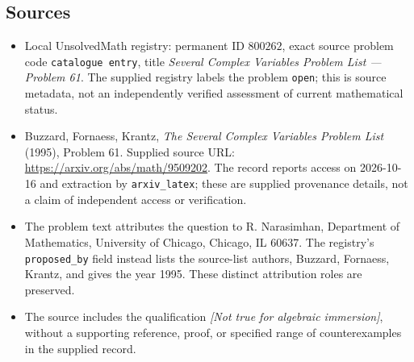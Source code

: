\documentclass[11pt]{article}
\begin{document}
\subsection{Sources}
\begin{itemize}
\item Local UnsolvedMath registry: permanent ID \(800262\), exact source problem code \texttt{catalogue entry}, title \emph{Several Complex Variables Problem List --- Problem 61}. The supplied registry labels the problem \texttt{open}; this is source metadata, not an independently verified assessment of current mathematical status.
\item Buzzard, Fornaess, Krantz, \emph{The Several Complex Variables Problem List} (1995), Problem 61. Supplied source URL: \url{https://arxiv.org/abs/math/9509202}. The record reports access on 2026-10-16 and extraction by \texttt{arxiv\_latex}; these are supplied provenance details, not a claim of independent access or verification.
\item The problem text attributes the question to R. Narasimhan, Department of Mathematics, University of Chicago, Chicago, IL 60637. The registry's \texttt{proposed\_by} field instead lists the source-list authors, Buzzard, Fornaess, Krantz, and gives the year 1995. These distinct attribution roles are preserved.
\item The source includes the qualification \emph{[Not true for algebraic immersion]}, without a supporting reference, proof, or specified range of counterexamples in the supplied record.
\end{itemize}
\end{document}
